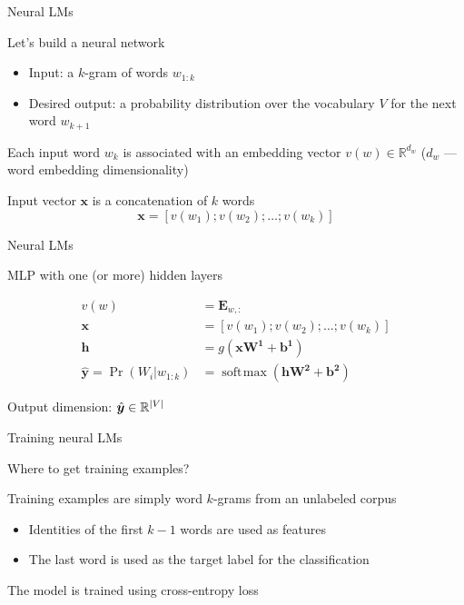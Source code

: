 \documentclass[12pt,aspectratio=169,handout]{beamer}
\DeclareMathOperator*{\softmax}{soft\!\max}
\begin{document}
\begin{frame}{Neural LMs}
	
Let's build a neural network
\begin{itemize}
	\item Input: a $k$-gram of words $w_{1:k}$
	\item Desired output: a probability distribution over the vocabulary $V$ for the next word $w_{k+1}$
\end{itemize}

Each input word $w_k$ is associated with an embedding vector $v(w) \in \mathbb{R}^{d_w}$ ($d_w$ --- word embedding dimensionality)

Input vector $\bm{x}$ is a concatenation of $k$ words
$$
\bm{x} = \left[ v(w_1); v(w_2); \ldots; v(w_k) \right]
$$

\end{frame}

\begin{frame}{Neural LMs}

MLP with one (or more) hidden layers
	
$$
\begin{aligned}
v(w) &= \bm{E}_{w,:} \\
\bm{x} &= \left[ v(w_1); v(w_2); \ldots; v(w_k) \right] \\
\bm{h} &= g(\bm{x} \bm{W^1} + \bm{b^1}) \\
\hat{\bm{y}} = \Pr(W_i | w_{1:k}) &= \softmax (\bm{h} \bm{W^2} + \bm{b^2})
\end{aligned}
$$

Output dimension: $\hat{\bm{y}} \in \mathbb{R}^{\abs{V}}$
	
\end{frame}

\begin{frame}{Training neural LMs}

Where to get training examples?
	
Training examples are simply word $k$-grams from an unlabeled corpus
\begin{itemize}
	\item Identities of the first $k - 1$ words are used as features
	\item The last word is used as the target label for the classification
\end{itemize}

The model is trained using cross-entropy loss
\end{frame}
\end{document}
